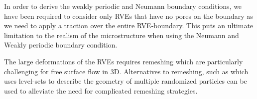 \documentclass[12pt,a4paper]{article}
\begin{document}
In order to derive the weakly periodic and Neumann boundary conditions, we have been required to consider only RVEs that have no pores on the boundary as we need to apply a traction over the entire RVE-boundary.
This puts an ultimate limitation to the realism of the microstructure when using the Neumann and Weakly periodic boundary condition.


The large deformations of the RVEs requires remeshing which are particularly challenging for free surface flow in 3D.
Alternatives to remeshing, such as \cite{pino_munoz_direct_2013} which uses level-sets to describe the geometry of multiple randomized particles can be used to alleviate the need for complicated remeshing strategies.


\printbibliography
\end{document}
